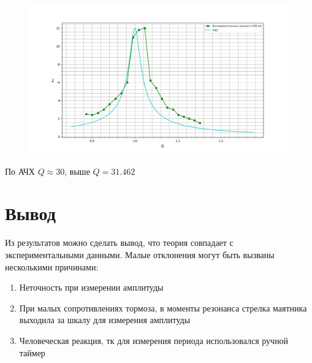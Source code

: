 \documentclass[a4paper]{article}
\begin{document}
\begin{figure}[H]
\begin{center}
\includegraphics[scale=0.5]{gra_6.png}
\end{center}
\end{figure}

По АЧХ $Q \approx 30$, выше $Q=31.462$
\section{\textbf{Вывод}}



Из результатов можно сделать вывод, что теория совпадает с экспериментальными данными. Малые отклонения могут быть вызваны несколькими причинами:
\begin{enumerate}
	\item Неточность при измерении амплитуды
	\item При малых сопротивлениях тормоза, в моменты резонанса стрелка маятника выходила за шкалу для измерения амплитуды
	\item Человеческая реакция, тк для измерения периода использовался ручной таймер
\end{enumerate}
\end{document}
